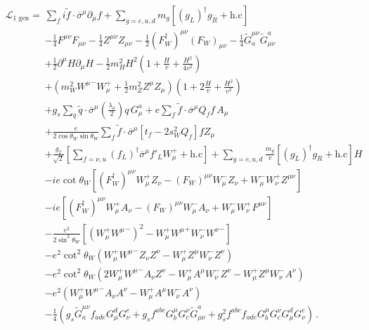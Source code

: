 \begin{frame}
\begin{align}
\label{eq:lsmw}
   \mathcal{L}_{\text{1 gen}}=&
\sum_f  i \widetilde{f}\cdot\overline{\sigma}^\mu\partial_\mu f 
+\sum_{g=e,u,d} m_g \left[ \left( g_L \right)^{\dagger} g_R+\text{h.c} \right]
\nonumber\\
&-\tfrac{1}{4}F^{\mu\nu} F_{\mu\nu}-\tfrac{1}{4}Z^{\mu\nu} Z_{\mu\nu}-\tfrac{1}{2}(F_W^\dagger)^{\mu\nu} (F_W)_{\mu\nu}
- \tfrac{1}{4}\widetilde{G}^{\mu\nu}_a \widetilde{G}_{\mu\nu}^a\nonumber\\
&+\tfrac{1}{2}\partial^\mu H\partial_\mu H
-\frac{1}{2}m_H^2H^2\left(1+\frac{H}{v}+\frac{H^2}{4v^2}\right)\nonumber\\
&+\left(m_W^2{W^\mu}^-W_\mu^++\frac{1}{2}m_Z^2Z^\mu Z_\mu\right)\left(1+2\frac{H}{v}+\frac{H^2}{v^2}\right)\nonumber\\
&+g_s\sum_q  \widetilde{q}\cdot\overline{\sigma}^\mu \left( \frac{\lambda_a}{2} \right) q\, G_\mu^a+e\sum_f  \widetilde{f}\cdot\overline{\sigma}^\mu Q_f f\, A_\mu \nonumber\\
&+\frac{e}{2\cos\theta_W \sin\theta_W} \sum_f\widetilde{f}\cdot\overline{\sigma}^{\mu}\left[t_f-2s_W^2Q_f\right]f Z_\mu \nonumber\\
&+\frac{g_2}{\sqrt{2}}\left[\sum_{f=\nu,u}(f_L)^\dagger \overline{\sigma}^\mu f'_LW_\mu^++\text{h.c}\right]
+\sum_{g=e,u,d} \frac{m_g}{v} \left[ \left( g_L \right)^{\dagger} g_R+\text{h.c} \right]H\nonumber\\
&-ie\cot\theta_W\left[(F_W^\dagger)^{\mu\nu}W_\mu^+ Z_\nu-(F_W)^{\mu\nu}W_\mu^- Z_\nu+W_\mu^-W_\nu^+Z^{\mu\nu}\right]\nonumber\\
&-ie\left[(F_W^\dagger)^{\mu\nu}W_\mu^+ A_\nu-(F_W)^{\mu\nu}W_\mu^- A_\nu+W_\mu^-W_\nu^+F^{\mu\nu}\right]\nonumber\\
&-\frac{e^2}{2\sin^2\theta_W}\left[\left(W_\mu^+{W^\mu}^-\right)^2-W_\mu^+{W^\mu}^+W_\nu^-{W^\nu}^-\right]\nonumber\\
&-e^2\cot^2\theta_W\left(W_\mu^+{W^\mu}^-Z_\nu Z^\nu-W_\mu^+Z^\mu W_\nu^-Z^\nu\right)\nonumber\\
&-e^2\cot^2\theta_W\left(2W_\mu^+{W^\mu}^-A_\nu Z^\nu-W_\mu^+A^\mu W_\nu^-Z^\nu-W_\mu^+Z^\mu W_\nu^-A^\nu\right)\nonumber\\
&-e^2\left(W_\mu^+{W^\mu}^-A_\nu A^\nu-W_\mu^+A^\mu W_\nu^-A^\nu\right)\nonumber\\
&- \frac{1}{4}\left(g_s\widetilde{G}^{\mu\nu}_af_{a d e}G^d_\mu G^e_\nu
    +g_sf^{a b c}G_b^\mu G_c^\nu\widetilde{G}_{\mu\nu}^a
    +g_s^2f^{a b c}f_{a d e}G_b^\mu G_c^\nu G^d_\mu G^e_\nu\right)\,.
\end{align}
\end{frame}

